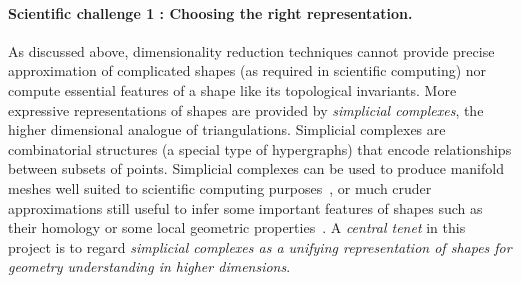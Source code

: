 \vspace{-3.1mm}


\paragraph{Scientific challenge 1 :  Choosing the right representation.}


As discussed above, dimensionality reduction techniques cannot provide precise approximation of complicated shapes (as required in scientific computing) nor compute essential features of a shape like its topological invariants.
More expressive representations of shapes are provided %
by {\em simplicial complexes}, the higher dimensional analogue of triangulations.
Simplicial complexes are combinatorial structures (a special type of hypergraphs) that encode relationships between subsets of points.
 Simplicial complexes can be used to produce manifold meshes well suited to scientific computing purposes~\cite{mh-mpc-2002,geometrica-7142i}, %
or much cruder approximations still useful to infer some important features of shapes such as their homology or some local geometric properties~\cite{nsw-fhm-2008}. 
 A {\em central tenet} in this project is to regard {\em simplicial complexes as a unifying representation of shapes for geometry understanding in higher dimensions}.%



